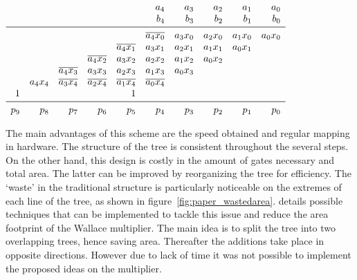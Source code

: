 \begin{center}
\captionsetup{type=table}
$\begin{array}{rrrrrrrrrr}
       &         &              &              &              & a_4          & a_3          & a_2          & a_1          & a_0\\
       &         &              &              &              & b_4          & b_3          & b_2          & b_1          & b_0\\\midrule
       &         &              &              &              & \ov{a_4x_0}  & a_3x_0       & a_2x_0       & a_1x_0       & a_0x_0\\
       &         &              &              & \ov{a_4x_1}  & a_3x_1       & a_2x_1       & a_1x_1       & a_0x_1       &\\
       &         &              & \ov{a_4x_2}  & a_3x_2       & a_2x_2       & a_1x_2       & a_0x_2       &              &\\
       &         & \ov{a_4x_3}  & a_3x_3       & a_2x_3       & a_1x_3       & a_0x_3       &              &              &\\
       & a_4x_4  & \ov{a_3x_4}  & \ov{a_2x_4}  & \ov{a_1x_4}  & \ov{a_0x_4}  &              &              &              &\\
1      &         &              &              & 1            &              &              &              &              &\\\midrule
p_9    & p_8     & p_7          & p_6          & p_5          & p_4          & p_3          & p_2          & p_1          & p_0\\
\end{array}$
\label{ex:bw}
\end{center}

The main advantages of this scheme are the speed obtained and regular mapping in hardware. The structure of the tree is consistent throughout the several steps. On the other hand, this design is costly in the amount of gates necessary and total area. The latter can be improved by reorganizing the tree for efficiency. The `waste' in the traditional structure is particularly noticeable on the extremes of each line of the tree, as shown in figure~\ref{fig:paper_wastedarea}. \cite{betterwallace} details possible techniques that can be implemented to tackle this issue and reduce the area footprint of the Wallace multiplier. The main idea is to split the tree into two overlapping trees, hence saving area. Thereafter the additions take place in opposite directions. 
However due to lack of time it was not possible to implement the proposed ideas on the multiplier.


